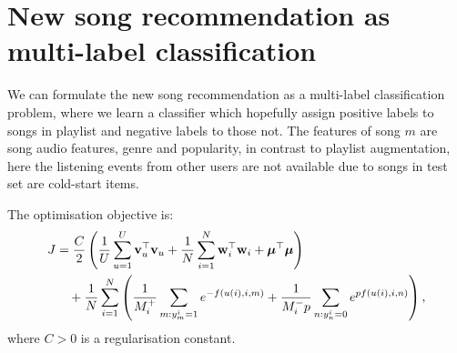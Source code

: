 \section{New song recommendation as multi-label classification}

We can formulate the new song recommendation as a multi-label classification problem,
where we learn a classifier which hopefully assign positive labels to songs in playlist and negative labels to those not.
The features of song $m$ are song audio features, genre and popularity, in contrast to playlist augmentation,
here the listening events from other users are not available due to songs in test set are cold-start items.

The optimisation objective is:
\begin{equation*}
\begin{aligned}
J &= \frac{C}{2} \left( \frac{1}{U} \sum_{u=1}^U \mathbf{v}_u^\top \mathbf{v}_u 
     + \frac{1}{N} \sum_{i=1}^N \mathbf{w}_i^\top \mathbf{w}_i + \bm{\mu}^\top \bm{\mu} \right) \\
& \hspace{1em}
     + \frac{1}{N} \sum_{i=1}^N \left( \frac{1}{M_i^+} \sum_{m: y_m^i = 1} e^{-f(u(i), i, m)} 
     + \frac{1}{M_i^- p} \sum_{n: y_n^i = 0} e^{p f(u(i), i, n)} \right),
\end{aligned}
\end{equation*}
where $C > 0$ is a regularisation constant.
